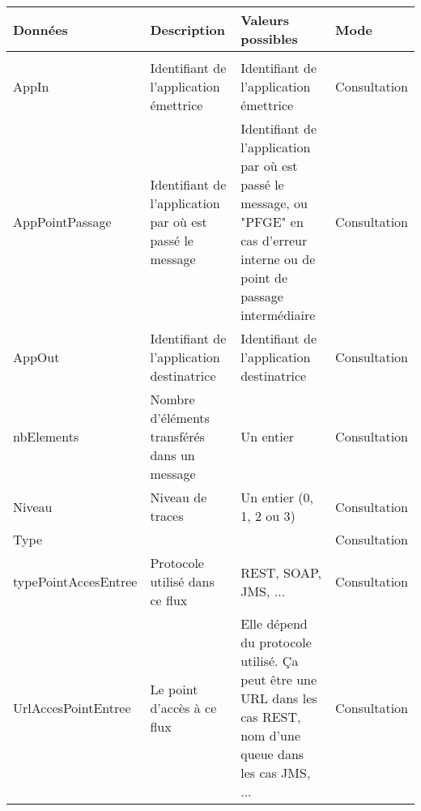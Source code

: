 \begin{longtable}{|>{\setlength{\hsize}{.8\hsize}}X|>{\setlength{\hsize}{.8\hsize}}X|>{\setlength{\hsize}{1.6\hsize}}X|>{\setlength{\hsize}{.8\hsize}}X|}
	\hline
	Données& Description& Valeurs possibles& Mode\\
	\hline\hline
	\multicolumn{4}{|c|}{Attribute} \\
	AppIn& Identifiant de l'application émettrice&
	Identifiant de l'application émettrice&
	Consultation\\\hline
	
	AppPointPassage& Identifiant de l'application par où est passé le message
	&Identifiant de l'application par où est passé le message, ou "PFGE" en cas d'erreur interne ou de point de passage intermédiaire
	&Consultation\\\hline
	
	AppOut& Identifiant de l'application destinatrice
	&Identifiant de l'application destinatrice
	&Consultation\\\hline
	
	nbElements& Nombre d'éléments transférés dans un message
	&Un entier& Consultation\\\hline
	
	Niveau& Niveau de traces& Un entier (0, 1, 2 ou 3)& Consultation\\\hline
	 Type&&& Consultation\\\hline
	
	typePointAccesEntree& Protocole utilisé dans ce flux&
	REST, SOAP, JMS, ... &Consultation\\\hline
	
	UrlAccesPointEntree& Le point d'accès à ce flux& Elle dépend du protocole utilisé. Ça peut être une URL dans les cas REST, nom d'une queue dans les cas JMS, ...
	&Consultation\\\hline
	

\end{longtable}
